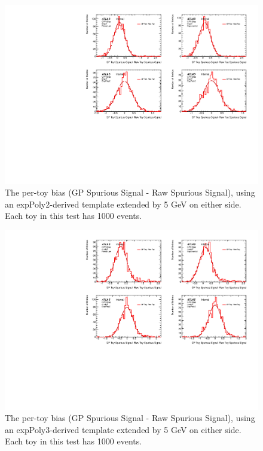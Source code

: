 \begin{figure} 
\begin{center}
  \includegraphics[width=\textwidth]{figures/background/gpr/validation/padded/ToyTest_FitSigBiases_lowpT_1000_noSig}   
\caption{The per-toy bias (GP Spurious Signal - Raw Spurious Signal), using an expPoly2-derived template extended by 5 GeV on either side. Each toy in this test has 1000 events.}
\label{fig:bias_padded_lowpt_1000_noSig}
\end{center}
\end{figure}

\begin{figure} 
\begin{center}
  \includegraphics[width=\textwidth]{figures/background/gpr/validation/padded/ToyTest_FitSigBiases_medpT_1000_noSig}   
\caption{The per-toy bias (GP Spurious Signal - Raw Spurious Signal), using an expPoly3-derived template extended by 5 GeV on either side. Each toy in this test has 1000 events.}
\label{fig:bias_padded_medpt_1000_noSig}
\end{center}
\end{figure}

